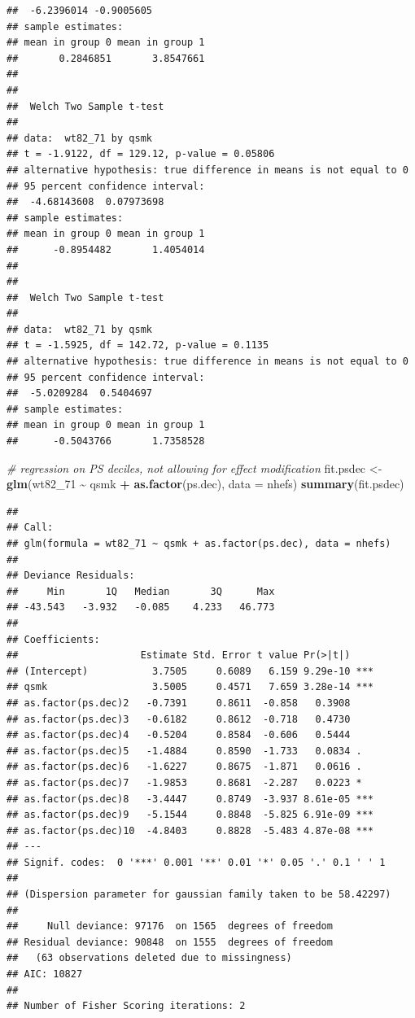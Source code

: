 \documentclass[
  10pt,
]{book}
\newenvironment{Shaded}{\begin{snugshade}}{\end{snugshade}}
\newcommand{\CommentTok}[1]{\textcolor[rgb]{0.56,0.35,0.01}{\textit{#1}}}
\newcommand{\DataTypeTok}[1]{\textcolor[rgb]{0.13,0.29,0.53}{#1}}
\newcommand{\DecValTok}[1]{\textcolor[rgb]{0.00,0.00,0.81}{#1}}
\newcommand{\KeywordTok}[1]{\textcolor[rgb]{0.13,0.29,0.53}{\textbf{#1}}}
\newcommand{\NormalTok}[1]{#1}
\newcommand{\OperatorTok}[1]{\textcolor[rgb]{0.81,0.36,0.00}{\textbf{#1}}}
\newcommand{\StringTok}[1]{\textcolor[rgb]{0.31,0.60,0.02}{#1}}
\begin{document}
\begin{verbatim}
##  -6.2396014 -0.9005605
## sample estimates:
## mean in group 0 mean in group 1 
##       0.2846851       3.8547661 
## 
## 
##  Welch Two Sample t-test
## 
## data:  wt82_71 by qsmk
## t = -1.9122, df = 129.12, p-value = 0.05806
## alternative hypothesis: true difference in means is not equal to 0
## 95 percent confidence interval:
##  -4.68143608  0.07973698
## sample estimates:
## mean in group 0 mean in group 1 
##      -0.8954482       1.4054014 
## 
## 
##  Welch Two Sample t-test
## 
## data:  wt82_71 by qsmk
## t = -1.5925, df = 142.72, p-value = 0.1135
## alternative hypothesis: true difference in means is not equal to 0
## 95 percent confidence interval:
##  -5.0209284  0.5404697
## sample estimates:
## mean in group 0 mean in group 1 
##      -0.5043766       1.7358528
\end{verbatim}

\begin{Shaded}
\begin{Highlighting}[]
\CommentTok{\# regression on PS deciles, not allowing for effect modification}
\NormalTok{fit.psdec \textless{}{-}}\StringTok{ }\KeywordTok{glm}\NormalTok{(wt82\_}\DecValTok{71} \OperatorTok{\textasciitilde{}}\StringTok{ }\NormalTok{qsmk }\OperatorTok{+}\StringTok{ }\KeywordTok{as.factor}\NormalTok{(ps.dec), }\DataTypeTok{data =}\NormalTok{ nhefs)}
\KeywordTok{summary}\NormalTok{(fit.psdec)}
\end{Highlighting}
\end{Shaded}

\begin{verbatim}
## 
## Call:
## glm(formula = wt82_71 ~ qsmk + as.factor(ps.dec), data = nhefs)
## 
## Deviance Residuals: 
##     Min       1Q   Median       3Q      Max  
## -43.543   -3.932   -0.085    4.233   46.773  
## 
## Coefficients:
##                     Estimate Std. Error t value Pr(>|t|)    
## (Intercept)           3.7505     0.6089   6.159 9.29e-10 ***
## qsmk                  3.5005     0.4571   7.659 3.28e-14 ***
## as.factor(ps.dec)2   -0.7391     0.8611  -0.858   0.3908    
## as.factor(ps.dec)3   -0.6182     0.8612  -0.718   0.4730    
## as.factor(ps.dec)4   -0.5204     0.8584  -0.606   0.5444    
## as.factor(ps.dec)5   -1.4884     0.8590  -1.733   0.0834 .  
## as.factor(ps.dec)6   -1.6227     0.8675  -1.871   0.0616 .  
## as.factor(ps.dec)7   -1.9853     0.8681  -2.287   0.0223 *  
## as.factor(ps.dec)8   -3.4447     0.8749  -3.937 8.61e-05 ***
## as.factor(ps.dec)9   -5.1544     0.8848  -5.825 6.91e-09 ***
## as.factor(ps.dec)10  -4.8403     0.8828  -5.483 4.87e-08 ***
## ---
## Signif. codes:  0 '***' 0.001 '**' 0.01 '*' 0.05 '.' 0.1 ' ' 1
## 
## (Dispersion parameter for gaussian family taken to be 58.42297)
## 
##     Null deviance: 97176  on 1565  degrees of freedom
## Residual deviance: 90848  on 1555  degrees of freedom
##   (63 observations deleted due to missingness)
## AIC: 10827
## 
## Number of Fisher Scoring iterations: 2
\end{verbatim}
\end{document}
